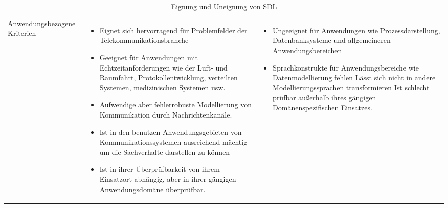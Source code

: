 \pagebreak
\begin{table}[ht]
\begin{tabularx}{\textwidth}{|l|X|X|}
	\hline
	Anwendungsbezogene	Kriterien &
	\begin{itemize}
		\item Eignet sich hervorragend für Problemfelder der Telekommunikationsbranche
		\item Geeignet für Anwendungen mit Echtzeitanforderungen wie der Luft- und Raumfahrt, Protokollentwicklung, verteilten Systemen, medizinischen Systemen usw. 
		\item Aufwendige aber fehlerrobuste	Modellierung von Kommunikation durch Nachrichtenkanäle.
		\item Ist in den benutzen Anwendungsgebieten von Kommunikationssystemen ausreichend mächtig um die Sachverhalte darstellen zu können
		\item Ist in ihrer Überprüfbarkeit von ihrem Einsatzort abhängig, aber in ihrer gängigen Anwendungsdomäne überprüfbar. 
	\end{itemize}   &

\begin{itemize}
	\item Ungeeignet für Anwendungen wie Prozessdarstellung, Datenbanksysteme und allgemeineren Anwendungsbereichen
	\item Sprachkonstrukte für Anwendungsbereiche  wie Datenmodellierung fehlen
	\hline Lässt sich nicht in andere Modellierungssprachen transformieren
	\hline Ist schlecht prüfbar außerhalb ihres gängigen Domänenspezifischen Einsatzes.
\end{itemize}
\end{tabularx} 
\caption{Eignung und Uneignung von SDL}
\label{tab:EignungSDL}
\end{table} 